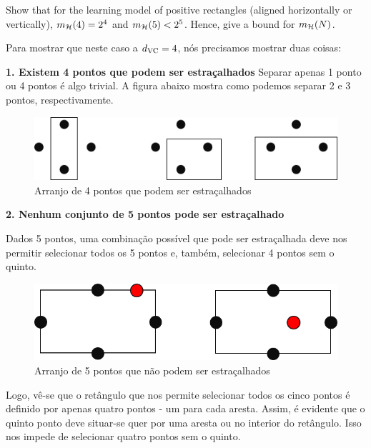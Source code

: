 \begin{enunciado}{2}
    Show that for the learning model of positive rectangles (aligned horizontally or vertically), $m_{\mathcal{H}}(4) = 2^4$ and $m_{\mathcal{H}}(5) < 2^5$. Hence, give a bound for $m_{\mathcal{H}}(N)$.
\end{enunciado}

Para mostrar que neste caso a $d_{\text{VC}} = 4$, nós precisamos mostrar duas coisas:

\textbf{1. Existem 4 pontos que podem ser estraçalhados}
Separar apenas 1 ponto ou 4 pontos é algo trivial. A figura abaixo mostra como podemos separar 2 e 3 pontos, respectivamente.

\begin{figure}[h]
	\centering
	\begin{minipage}{0.46\textwidth}
		\centering
		\includegraphics[width=\textwidth]{images/2-2-dvc4.png}
		\caption{Arranjo de 4 pontos que podem ser estraçalhados}
	\end{minipage}
\end{figure}

\textbf{2. Nenhum conjunto de 5 pontos pode ser estraçalhado}

Dados 5 pontos, uma combinação possível que pode ser estraçalhada deve nos permitir selecionar todos os 5 pontos
e, também, selecionar 4 pontos sem o quinto.

\begin{figure}[h]
	\centering
	\begin{minipage}{0.45\textwidth}
		\centering
		\includegraphics[width=\textwidth]{images/2-2-dvc5.png}
		\caption{Arranjo de 5 pontos que não podem ser estraçalhados}
	\end{minipage}
\end{figure}

Logo, vê-se que o retângulo que nos permite selecionar todos os cinco pontos é definido por apenas quatro pontos
- um para cada aresta. Assim, é evidente que o quinto ponto deve situar-se quer por uma aresta ou no interior do
retângulo. Isso nos impede de selecionar quatro pontos sem o quinto.